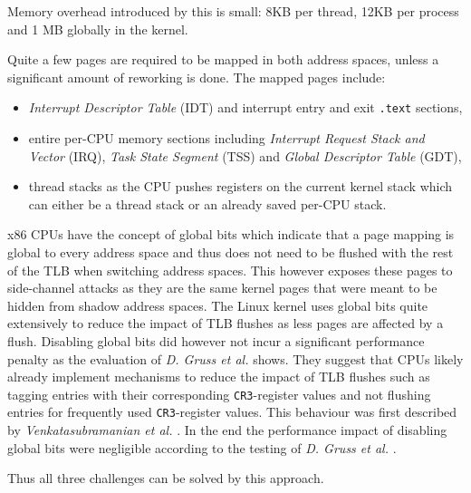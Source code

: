 Memory overhead introduced by this is small: 8KB per thread, 12KB per process and 1 MB globally in the kernel.\cite{kaiser}

Quite a few pages are required to be mapped in both address spaces, unless a significant amount of reworking is done.
The mapped pages include:

\begin{itemize}
  \item{\textit{Interrupt Descriptor Table} (IDT) and interrupt entry and exit \lstinline{.text} sections,}
  \item{entire per-CPU memory sections including \textit{Interrupt Request Stack and Vector} (IRQ), \textit{Task State Segment} (TSS) and \textit{Global Descriptor Table} (GDT),}
  \item{thread stacks as the CPU pushes registers on the current kernel stack which can either be a thread stack or an already saved per-CPU stack.}
\end{itemize}

x86 CPUs have the concept of global bits which indicate that a page mapping is global to every address space and thus does not need to be flushed with the rest of the TLB when switching address spaces.
This however exposes these pages to side-channel attacks as they are the same kernel pages that were meant to be hidden from shadow address spaces.
The Linux kernel uses global bits quite extensively to reduce the impact of TLB flushes as less pages are affected by a flush.
Disabling global bits did however not incur a significant performance penalty as the evaluation of \textit{D. Gruss et al.} \cite{kaiser} shows.
They suggest that CPUs likely already implement mechanisms to reduce the impact of TLB flushes such as tagging entries with their corresponding \lstinline{CR3}-register values and not flushing entries for frequently used \lstinline{CR3}-register values.
This behaviour was first described by \textit{Venkatasubramanian et al.} \cite{tlb-management-framework}.
In the end the performance impact of disabling global bits were negligible according to the testing of \textit{D. Gruss et al.} \cite{kaiser}.

Thus all three challenges can be solved by this approach.
